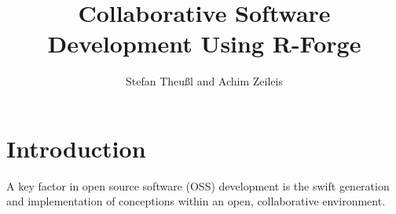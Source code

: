 \title{Collaborative Software Development Using R-Forge}
\author{Stefan Theu\ss{}l and Achim Zeileis}

\maketitle



\newcommand{\tab}[1]{{\normalfont\textit{#1}}}

\section*{Introduction}


A key factor in open source software (OSS) development is the swift
generation and implementation of conceptions within an open,
collaborative environment. 



